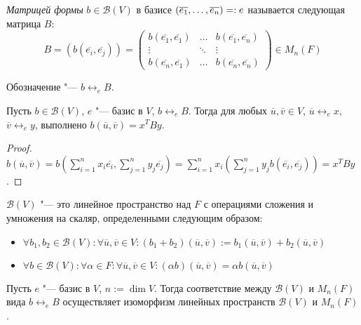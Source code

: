 \begin{definition}
	 \textit{Матрицей формы} $b \in \mathcal{B}(V)$ в базисе $(\overline{e_1}, \dots, \overline{e_n}) \hm{=:} e$ называется следующая матрица $B$:
	\[B = (b(\overline{e_i}, \overline{e_j})) = \begin{pmatrix}b(\overline{e_1}, \overline{e_1}) & \dots & b(\overline{e_1}, \overline{e_n})\\
		\vdots & \ddots & \vdots\\
		b(\overline{e_n}, \overline{e_1}) & \dots & b(\overline{e_n}, \overline{e_n})
	\end{pmatrix} \in M_n(F)\]
	
	Обозначение "--- $b \leftrightarrow_e B$.
\end{definition}

\begin{proposition}
	Пусть $b \in \mathcal{B}(V)$, $e$ "--- базис в $V$, $b \leftrightarrow_e B$. Тогда для любых $\overline{u}, \overline{v} \in V$, $\overline{u} \leftrightarrow_e x$, $\overline{v} \leftrightarrow_e y$, выполнено $b(\overline{u}, \overline{v}) = x^TBy$.
\end{proposition}

\begin{proof}
	$b(\overline{u}, \overline{v}) = b(\sum_{i = 1}^nx_i\overline{e_i}, \sum_{j = 1}^ny_j\overline{e_j}) = \sum_{i = 1}^nx_i(\sum_{j = 1}^ny_jb(\overline{e_i}, \overline{e_j})) = x^TBy$.
\end{proof}

\begin{note}
	$\mathcal{B}(V)$ "--- это линейное пространство над $F$ с операциями сложения и умножения на скаляр, определенными следующим образом:
	\begin{itemize}
		\item $\forall b_1, b_2 \in \mathcal{B}(V): \forall \overline{u}, \overline{v} \in V: (b_1 + b_2)(\overline{u}, \overline{v}) := b_1(\overline{u}, \overline{v}) + b_2(\overline{u}, \overline{v})$
		\item $\forall b \in \mathcal{B}(V): \forall \alpha \in F: \forall \overline{u}, \overline{v} \in V: (\alpha b)(\overline{u}, \overline{v}) = \alpha b(\overline{u}, \overline{v})$
	\end{itemize}
\end{note}

\begin{theorem}
	Пусть $e$ "--- базис в $V$, $n := \dim{V}$. Тогда соответствие между $\mathcal{B}(V)$ и $M_n(F)$ вида $b \leftrightarrow_e B$ осуществляет изоморфизм линейных пространств $\mathcal{B}(V)$ и $M_n(F)$.
\end{theorem}

